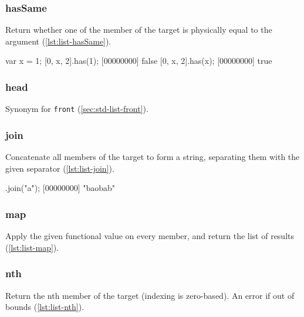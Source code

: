 \subsubsection{hasSame}

Return whether one of the member of the target is physically equal to
the argument (\autoref{lst:list-hasSame}).

\begin{urbiscript}[caption=List.hasSame, label=lst:list-hasSame, float=\floatposh]
var x = 1;
[0, x, 2].has(1);
[00000000] false
[0, x, 2].has(x);
[00000000] true
\end{urbiscript}

\subsubsection{head}

Synonym for \lstinline|front| (\autoref{sec:std-list-front}).

\subsubsection{join}

Concatenate all members of the target to form a string, separating
them with the given separator (\autoref{lst:list-join}).

\begin{urbiscript}[caption=List.join, label=lst:list-join, float=\floatposh]
["b", "ob", "b"].join("a");
[00000000] "baobab"
\end{urbiscript}

\subsubsection{map}

Apply the given functional value on every member, and return the list
of results (\autoref{lst:list-map}).


\subsubsection{nth}
\label{sec:std-list-nth}

Return the nth member of the target (indexing is zero-based). An error
if out of bounds (\autoref{lst:list-nth}).

